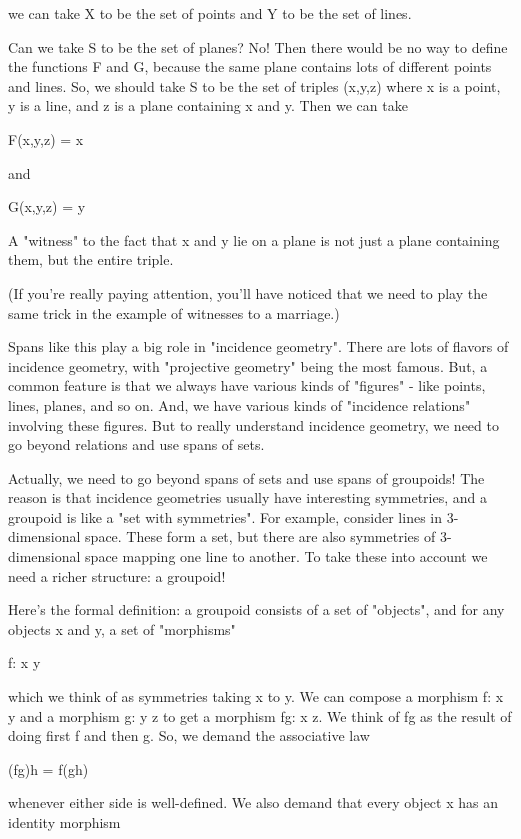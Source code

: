 we can take X to be the set of points and Y to be the set of lines.

Can we take S to be the set of planes?  No!  Then there would be no way 
to define the functions F and G, because the same plane contains lots of
different points and lines.   So, we should take S to be the set of 
triples (x,y,z) where x is a point, y is a line, and z is a plane
containing x and y.  Then we can take

F(x,y,z) = x

and

G(x,y,z) = y

A "witness" to the fact that x and y lie on a plane is not just a
plane containing them, but the entire triple.

(If you're really paying attention, you'll have noticed that we need to 
play the same trick in the example of witnesses to a marriage.) 

Spans like this play a big role in "incidence geometry".  There are 
lots of flavors of incidence geometry, with "projective geometry" 
being the most famous.  But, a common feature is that we always have 
various kinds of "figures" - like points, lines, planes, and so on.  
And, we have various kinds of "incidence relations" involving these 
figures.  But to really understand incidence geometry, we need to 
go beyond relations and use spans of sets.

Actually, we need to go beyond spans of sets and use spans of
groupoids!  The reason is that incidence geometries usually have
interesting symmetries, and a groupoid is like a "set with
symmetries".  For example, consider lines in 3-dimensional space.
These form a set, but there are also symmetries of 3-dimensional space
mapping one line to another.  To take these into account we need a
richer structure: a groupoid!

Here's the formal definition: a groupoid consists of a set of
"objects", and for any objects x and y, a set of
"morphisms"

f: x \to  y

which we think of as symmetries taking x to y.  We can compose a
morphism f: x \to  y and a morphism g: y \to  z to get a morphism
fg: x \to  z.  We think of fg as the result of doing first f and
then g.  So, we demand the associative law

(fg)h = f(gh)

whenever either side is well-defined.  We also demand that every object 
x has an identity morphism

